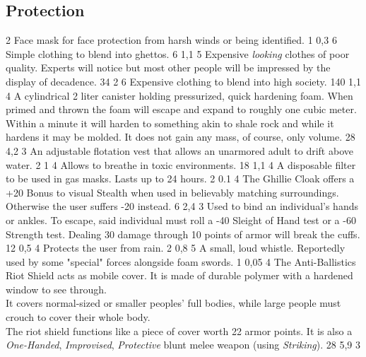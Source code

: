 \subsection{Protection}
\vspace{10mm}
\begin{multicols}{2}
    {Face mask for face protection from harsh winds or being identified.}
    {1}
    {0,3}
    {6}
    {Simple clothing to blend into ghettos.}
    {6}
    {1,1}
    {5}
    {Expensive \emph{looking} clothes of poor quality.
        Experts will notice but most other people will be impressed by the display of decadence.}
    {34}
    {2}
    {6}
    {Expensive clothing to blend into high society.}
    {140}
    {1,1}
    {4}
    {A cylindrical 2 liter canister holding pressurized, quick hardening foam.
        When primed and thrown the foam will escape and expand to roughly one cubic meter.
        Within a minute it will harden to something akin to shale rock and while it hardens it may be molded.
        It does not gain any mass, of course, only volume.}
    {28}
    {4,2}
    {3}
    {An adjustable flotation vest that allows an unarmored adult to drift above water.}
    {2}
    {1}
    {4}
    {Allows to breathe in toxic environments.}
    {18}
    {1,1}
    {4}
    {A disposable filter to be used in gas masks.
        Lasts up to 24 hours.}
    {2}
    {0.1}
    {4}
    {The Ghillie Cloak offers a +20 Bonus to visual Stealth when used in believably matching surroundings.
        Otherwise the user suffers -20 instead.}
    {6}
    {2,4}
    {3}
    {Used to bind an individual’s hands or ankles.
        To escape, said individual must roll a -40 Sleight of Hand test or a -60 Strength test.
        Dealing 30 damage through 10 points of armor will break the cuffs.}
    {12}
    {0,5}
    {4}
    {Protects the user from rain.}
    {2}
    {0,8}
    {5}
    {A small, loud whistle. Reportedly used by some "special" forces alongside foam swords.}
    {1}
    {0,05}
    {4}
    {The Anti-Ballistics Riot Shield acts as mobile cover.
        It is made of durable polymer with a hardened window to see through.\\
        It covers normal-sized or smaller peoples' full bodies,
        while large people must crouch to cover their whole body.\\
        The riot shield functions like a piece of cover worth 22 armor points.
    	It is also a
    		\emph{One-Handed},
    		\emph{Improvised},
    		\emph{Protective}
    		blunt melee weapon
    		(using \emph{Striking}).
	}
    {28}
    {5,9}
    {3}
\end{multicols}

